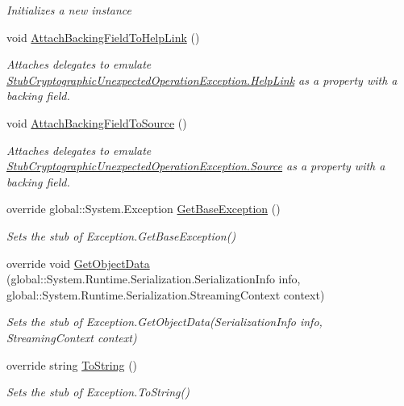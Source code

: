 \begin{DoxyCompactItemize}
\begin{DoxyCompactList}\small\item\em Initializes a new instance\end{DoxyCompactList}\item 
void \hyperlink{class_system_1_1_security_1_1_cryptography_1_1_fakes_1_1_stub_cryptographic_unexpected_operation_exception_a7c9ea47b92e22c4a4a0927a05b0a219b}{Attach\-Backing\-Field\-To\-Help\-Link} ()
\begin{DoxyCompactList}\small\item\em Attaches delegates to emulate \hyperlink{class_system_1_1_security_1_1_cryptography_1_1_fakes_1_1_stub_cryptographic_unexpected_operation_exception_ac1904ff89a1dc8cd48123bfd8f941405}{Stub\-Cryptographic\-Unexpected\-Operation\-Exception.\-Help\-Link} as a property with a backing field.\end{DoxyCompactList}\item 
void \hyperlink{class_system_1_1_security_1_1_cryptography_1_1_fakes_1_1_stub_cryptographic_unexpected_operation_exception_a810591acd0c3f75a12f44cd9a5fba313}{Attach\-Backing\-Field\-To\-Source} ()
\begin{DoxyCompactList}\small\item\em Attaches delegates to emulate \hyperlink{class_system_1_1_security_1_1_cryptography_1_1_fakes_1_1_stub_cryptographic_unexpected_operation_exception_a8462caeb9f0552f55eb74394362f0e9c}{Stub\-Cryptographic\-Unexpected\-Operation\-Exception.\-Source} as a property with a backing field.\end{DoxyCompactList}\item 
override global\-::\-System.\-Exception \hyperlink{class_system_1_1_security_1_1_cryptography_1_1_fakes_1_1_stub_cryptographic_unexpected_operation_exception_a7a658ba8eea390c98aafed831f126d12}{Get\-Base\-Exception} ()
\begin{DoxyCompactList}\small\item\em Sets the stub of Exception.\-Get\-Base\-Exception()\end{DoxyCompactList}\item 
override void \hyperlink{class_system_1_1_security_1_1_cryptography_1_1_fakes_1_1_stub_cryptographic_unexpected_operation_exception_a2523f87e5135ff5814caea3eb3fc3d01}{Get\-Object\-Data} (global\-::\-System.\-Runtime.\-Serialization.\-Serialization\-Info info, global\-::\-System.\-Runtime.\-Serialization.\-Streaming\-Context context)
\begin{DoxyCompactList}\small\item\em Sets the stub of Exception.\-Get\-Object\-Data(\-Serialization\-Info info, Streaming\-Context context)\end{DoxyCompactList}\item 
override string \hyperlink{class_system_1_1_security_1_1_cryptography_1_1_fakes_1_1_stub_cryptographic_unexpected_operation_exception_a27018e5107bea95f2a5e0c8f5e5c2f48}{To\-String} ()
\begin{DoxyCompactList}\small\item\em Sets the stub of Exception.\-To\-String()\end{DoxyCompactList}\end{DoxyCompactItemize}
